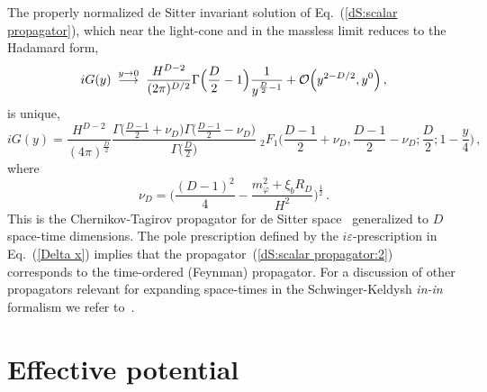 \documentclass[aps,12pt,superscriptaddress,preprintnumbers,
                secnumarabic,nofootinbib,showpacs]{revtex4}
\begin{document}
The properly normalized de Sitter invariant solution of
Eq.~(\ref{dS:scalar propagator}),
which near the light-cone and in the massless limit reduces to the Hadamard
form,
\begin{equation}
  iG(y)\; \stackrel{y\rightarrow 0}{\longrightarrow}\;
 \frac{H^{D-2}}{(2\pi)^{D/2}}\Gamma\Big(\frac{D}{2}-1\Big)
               \frac{1}{y^{\frac{D}{2}-1}}
   + {\cal O}\Big(y^{2-D/2},y^0\Big)
\,,
\label{dS:Hadamard form}
\end{equation}
is unique,
\begin{equation}
    iG(y) = \frac{H^{D-2}}{(4\pi)^{\frac{D}{2}}}
           \frac{\Gamma\Big(\frac{D-1}{2}+\nu_D\Big)
                     \Gamma\Big(\frac{D-1}{2}-\nu_D\Big)}{\Gamma\Big(\frac{D}{2}\Big)}
                 \phantom{\;}_2F_1\Big(
                                   \frac{D-1}{2}+\nu_D,
                                   \frac{D-1}{2}-\nu_D;
                                   \frac{D}{2};
                                   1-\frac{y}{4}
                              \Big)
\,,
\label{dS:scalar propagator:2}
\end{equation}
where
\begin{equation}
    \nu_D = \bigg({\frac{(D-1)^2}{4}
               -  \frac{m_\varphi^2 + \xi_b R_D}{H^2}}
            \bigg)^\frac 12
\,.
\label{dS:scalar propagator:nu}
\end{equation}
This is the Chernikov-Tagirov propagator for de Sitter
space~\cite{ChernikovTagirov:1968,Tagirov:1972}
generalized to $D$ space-time dimensions.
 The pole prescription defined by the $i\varepsilon$-prescription in
Eq.~(\ref{Delta x})
implies that the propagator~(\ref{dS:scalar propagator:2})
corresponds to the time-ordered (Feynman) propagator.
For a discussion of other propagators relevant for expanding space-times
in the Schwinger-Keldysh {\it in-in} formalism we refer
to~\cite{ProkopecPuchwein:2003,Weinberg:2005}.

\bigskip

\section{Effective potential}
\label{Effective potential}
\end{document}
